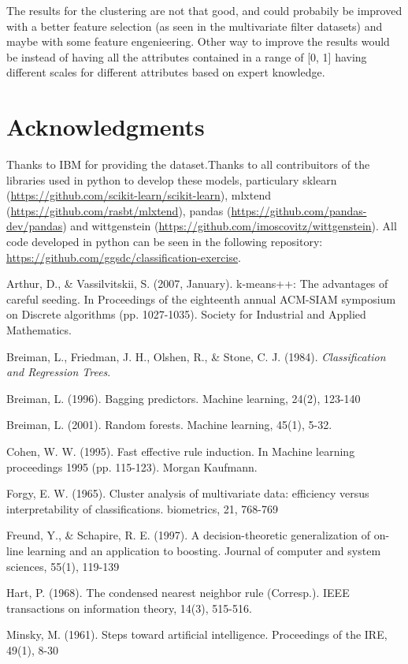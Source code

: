 \documentclass[a4paper,11pt]{article}
\begin{document}
The results for the clustering are not that good, and could probabily be improved with a better feature selection (as seen in the multivariate filter datasets) and maybe with some feature engenieering. Other way to improve the results would be instead of having all the attributes contained in a range of [0, 1] having different scales for different attributes based on expert knowledge.

\section{Acknowledgments}

Thanks to IBM for providing the dataset.Thanks to all contribuitors of the libraries used in python to develop these models, particulary sklearn (\url{https://github.com/scikit-learn/scikit-learn}), mlxtend (\url{https://github.com/rasbt/mlxtend}), pandas (\url{https://github.com/pandas-dev/pandas}) and wittgenstein (\url{https://github.com/imoscovitz/wittgenstein}).
All code developed in python can be seen in the following repository: \url{https://github.com/ggsdc/classification-exercise}.



\begin{thebibliography}{}

Arthur, D., \& Vassilvitskii, S. (2007, January). k-means++: The advantages of careful seeding. In Proceedings of the eighteenth annual ACM-SIAM symposium on Discrete algorithms (pp. 1027-1035). Society for Industrial and Applied Mathematics.

Breiman, L., Friedman, J. H., Olshen, R., \& Stone, C. J. (1984). \textit{Classification and Regression Trees}.

Breiman, L. (1996). Bagging predictors. Machine learning, 24(2), 123-140

Breiman, L. (2001). Random forests. Machine learning, 45(1), 5-32.

Cohen, W. W. (1995). Fast effective rule induction. In Machine learning proceedings 1995 (pp. 115-123). Morgan Kaufmann.

Forgy, E. W. (1965). Cluster analysis of multivariate data: efficiency versus interpretability of classifications. biometrics, 21, 768-769

Freund, Y., \& Schapire, R. E. (1997). A decision-theoretic generalization of on-line learning and an application to boosting. Journal of computer and system sciences, 55(1), 119-139

Hart, P. (1968). The condensed nearest neighbor rule (Corresp.). IEEE transactions on information theory, 14(3), 515-516.

Minsky, M. (1961). Steps toward artificial intelligence. Proceedings of the IRE, 49(1), 8-30


\end{thebibliography}
\end{document}
